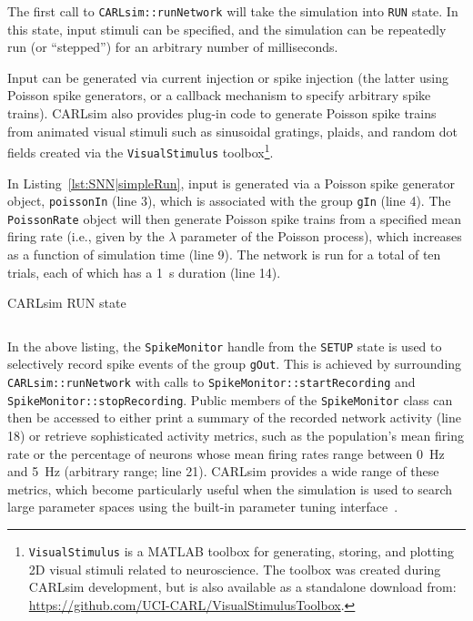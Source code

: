 The first call to \texttt{CARLsim::runNetwork} will take the simulation
into \texttt{RUN} state.
In this state, input stimuli can be specified,
and the simulation can be repeatedly run (or ``stepped'') for
an arbitrary number of milliseconds.

Input can be generated via current injection or spike
injection (the latter using Poisson spike generators, or a
callback mechanism to specify arbitrary spike trains).
CARLsim also provides plug-in code to generate Poisson spike trains from
animated visual stimuli such as sinusoidal gratings, plaids, and
random dot fields created via the \texttt{VisualStimulus} 
toolbox\footnote{\texttt{VisualStimulus} is a MATLAB toolbox for generating, 
storing, and plotting 2D visual stimuli related to neuroscience.
The toolbox was created during CARLsim development,
but is also available as a standalone download from:
\url{https://github.com/UCI-CARL/VisualStimulusToolbox}.}.

In Listing~\ref{lst:SNN|simpleRun}, input is generated via a Poisson
spike generator object, \texttt{poissonIn} (line 3), which is associated
with the group \texttt{gIn} (line 4).
The \texttt{PoissonRate} object will then generate Poisson spike trains
from a specified mean firing rate
(i.e., given by the $\lambda$ parameter of the Poisson process), which
increases as a function of simulation time (line 9).
The network is run for a total of ten trials, each of which has a
\SI{1}{\second} duration (line 14).

\begin{listing}[h]
\caption{CARLsim RUN state}
\vspace{-0.7cm}
\inputminted{c++}{listings/snn_simple_run.cpp}
\label{lst:SNN|simpleRun}
\end{listing}

In the above listing, the \texttt{SpikeMonitor} handle from the
\texttt{SETUP} state is used to selectively record spike events
of the group \texttt{gOut}.
This is achieved by surrounding \texttt{CARLsim::runNetwork}
with calls to \texttt{SpikeMonitor::startRecording} and
\texttt{SpikeMonitor::stopRecording}.
Public members of the \texttt{SpikeMonitor} class can then be
accessed to either print a summary of the recorded network
activity (line 18) or retrieve sophisticated activity metrics,
such as the population's mean firing rate or the percentage
of neurons whose mean firing rates range between \SI{0}{\hertz}
and \SI{5}{\hertz} (arbitrary range; line 21).
CARLsim provides a wide range of these metrics,
which become particularly useful when the simulation is used to
search large parameter spaces using the built-in
parameter tuning interface~\citep{Beyeler2015a,Carlson2014b}.


